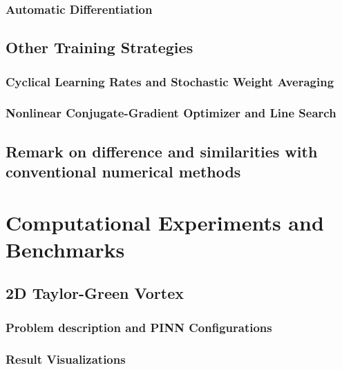 \documentclass[font=STIX2]{gw-dissertation}[2021/11/19]
\begin{document}
        \subsection{Automatic Differentiation}\label{sec:ad}
        

    \section{Other Training Strategies}
    

        \subsection{Cyclical Learning Rates and Stochastic Weight Averaging}\label{sec:cyclic-swa}
        

        \subsection{Nonlinear Conjugate-Gradient Optimizer and Line Search}\label{sec:ncg}
        

    \section{Remark on difference and similarities with conventional numerical methods}\label{sec:pinn-diff}
    

\chapter{Computational Experiments and Benchmarks}\label{chap:pinn-cases}

    \section{2D Taylor-Green Vortex}\label{sec:pinn-2d-tgv}

        \subsection{Problem description and PINN Configurations}
        \label{sec:pinn-2d-tgv-intro}
        

        \subsection{Result Visualizations}
        \label{sec:pinn-2d-tgv-vis}
        
\end{document}
